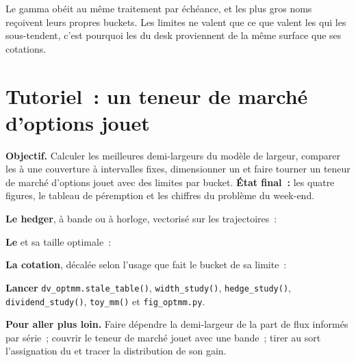 Le gamma obéit au même traitement par échéance, et les plus gros noms reçoivent leurs propres buckets. Les limites ne valent que ce que valent les  qui les sous-tendent, c'est pourquoi
les  du desk proviennent de la même surface que ses cotations.

\section{Tutoriel~: un teneur de marché d'options jouet}\label{tut:dv:options-market-making-in-practice:tut}

\begin{tutorial}
\textbf{Objectif.} Calculer les meilleures demi-largeurs du modèle de largeur, comparer les  à une couverture à intervalles fixes, dimensionner un  et faire tourner un teneur de marché d'options jouet avec
des limites par bucket. \textbf{État final~:} les quatre figures, le tableau de péremption et les chiffres du problème du week-end.
\begin{tutsteps}
\item \textbf{Le hedger}, à bande ou à horloge, vectorisé sur les trajectoires~:
\label{lst:dv:options-market-making-in-practice:hedge}
\item \textbf{Le } et sa taille optimale~:
\label{lst:dv:options-market-making-in-practice:play}
\item \textbf{La cotation}, décalée selon l'usage que fait le bucket de sa limite~:
\label{lst:dv:options-market-making-in-practice:quote}
\item \textbf{Lancer} \texttt{dv\_optmm.stale\_table()}, \texttt{width\_study()}, \texttt{hedge\_study()}, \texttt{dividend\_study()}, \texttt{toy\_mm()} et
\texttt{fig\_optmm.py}.
\end{tutsteps}
\textbf{Pour aller plus loin.} Faire dépendre la demi-largeur de la part de flux informés par série~; couvrir le teneur de marché jouet avec une bande~; tirer au sort
l'assignation du  et tracer la distribution de son gain.
\end{tutorial}

